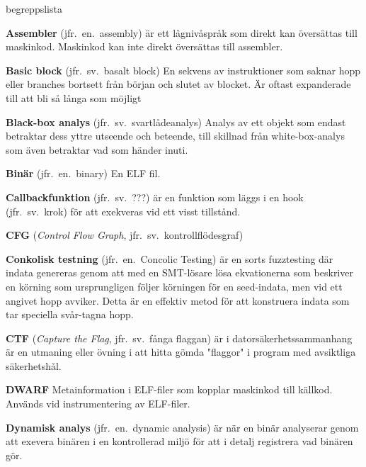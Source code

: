\begin{labeling}{begreppslista}

    \item [\textbf{Assembler}] (jfr.\ en.\ assembly) är ett lågnivåspråk som
    direkt kan översättas till maskinkod. Maskinkod kan inte direkt översättas
    till assembler.

    \item[\textbf{Basic block}] (jfr.\ sv.\ basalt block) En sekvens av
    instruktioner som saknar hopp eller branches bortsett från början och slutet
    av blocket. Är oftast expanderade till att bli så långa som möjligt

    \item [\textbf{Black-box analys}] (jfr.\ sv.\ svartlådeanalys) Analys av ett
    objekt som endast betraktar dess yttre utseende och beteende, till skillnad
    från white-box-analys som även betraktar vad som händer inuti.

    \item [\textbf{Binär}] (jfr.\ en.\ binary) En ELF fil.

    \item [\textbf{Callbackfunktion}] (jfr.\ sv.\ ???) är en funktion som läggs i en
    hook (jfr.\ sv.\ krok) för att exekveras vid ett visst tillstånd.

    \item [\textbf{CFG}] (\emph{Control Flow Graph}, jfr.\ sv.\
          kontrollflödesgraf)

    \item [\textbf{Conkolisk testning}] (jfr.\ en.\ Concolic Testing) är en sorts
    fuzztesting där indata genereras genom att med en SMT-lösare lösa
    ekvationerna som beskriver en körning som ursprungligen följer körningen för
    en seed-indata, men vid ett angivet hopp avviker. Detta är en effektiv metod
    för att konstruera indata som tar 	speciella svår-tagna hopp.

    \item [\textbf{CTF}] (\emph{Capture the Flag}, jfr.\ sv.\ fånga flaggan) är i
    datorsäkerhetssammanhang är en utmaning eller övning i att hitta gömda
    "flaggor" i program med avsiktliga säkerhetshål.

    \item [\textbf{DWARF}] Metainformation i ELF-filer som kopplar maskinkod
    till källkod. Används vid instrumentering av ELF-filer.

    \item [\textbf{Dynamisk analys}] (jfr.\ en.\ dynamic analysis) är när en binär
    analyserar genom att exevera binären i en kontrollerad miljö för att i
    detalj registrera vad binären gör.


\end{labeling}
